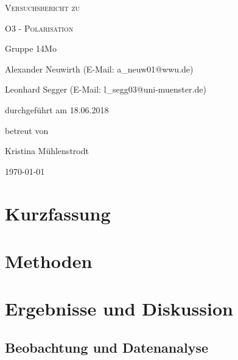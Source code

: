 \documentclass[
	a4paper,
	12pt,
	pagesize,
	ngerman
]{scrartcl}
\begin{document}
	
	\begin{titlepage}
		\centering
		{\scshape\LARGE Versuchsbericht zu \par}
		\vspace{1cm}
		{\scshape\huge O3 - Polarisation \par}
		\vspace{2.5cm}
		{\LARGE Gruppe 14Mo \par}
		\vspace{0.5cm}
		
		{\large Alexander Neuwirth (E-Mail: a\_neuw01@wwu.de) \par}
		{\large Leonhard Segger (E-Mail: l\_segg03@uni-muenster.de) \par}
		\vfill
		
		durchgeführt am 18.06.2018\par
		betreut von\par
		{\large Kristina Mühlenstrodt}
		
		\vfill
		
		{\large \today\par}
	\end{titlepage}
	\tableofcontents
	\newpage


	\section{Kurzfassung}
	
	\section{Methoden}
	
	\section{Ergebnisse und Diskussion}
	

	\subsection{Beobachtung und Datenanalyse}
\end{document}
